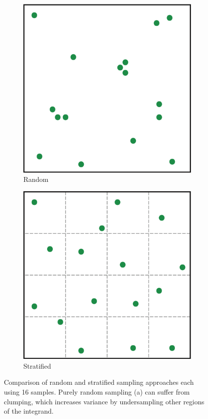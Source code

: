 \begin{figure}
\begin{center}
	\begin{subfigure}[b]{0.48\textwidth}
		\includegraphics[width=1.\textwidth]{graphics/gi/mc-12-1}
		\caption{Random}
	\end{subfigure}
	\begin{subfigure}[b]{0.48\textwidth}
		\includegraphics[width=1.\textwidth]{graphics/gi/mc-12-2}
		\caption{Stratified}
	\end{subfigure}
\end{center}
	\caption{Comparison of random and stratified sampling approaches each using 16 samples. Purely random sampling (a) can suffer from clumping, which increases variance by undersampling other regions of the integrand. }
	\label{f:placement}
\end{figure}


